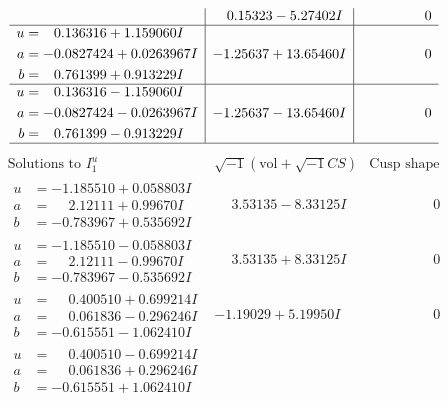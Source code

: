 \documentclass[1p]{elsarticle_modified}
\theoremstyle{definition}
\newcommand{\I}{\sqrt{-1}}
\begin{document}
$$\begin{array}{c|c|c}
 & \phantom{-}0.15323 - 5.27402 I & \phantom{-0.000000 } 0 \\ \hline\begin{aligned}
u &= \phantom{-}0.136316 + 1.159060 I \\
a &= -0.0827424 + 0.0263967 I \\
b &= \phantom{-}0.761399 + 0.913229 I\end{aligned}
 & -1.25637 + 13.65460 I & \phantom{-0.000000 } 0 \\ \hline\begin{aligned}
u &= \phantom{-}0.136316 - 1.159060 I \\
a &= -0.0827424 - 0.0263967 I \\
b &= \phantom{-}0.761399 - 0.913229 I\end{aligned}
 & -1.25637 - 13.65460 I & \phantom{-0.000000 } 0\\
 \hline 
 \end{array}$$\newpage$$\begin{array}{c|c|c}  
\text{Solutions to }I^u_{1}& \I (\text{vol} + \sqrt{-1}CS) & \text{Cusp shape}\\
 \hline 
\begin{aligned}
u &= -1.185510 + 0.058803 I \\
a &= \phantom{-}2.12111 + 0.99670 I \\
b &= -0.783967 + 0.535692 I\end{aligned}
 & \phantom{-}3.53135 - 8.33125 I & \phantom{-0.000000 } 0 \\ \hline\begin{aligned}
u &= -1.185510 - 0.058803 I \\
a &= \phantom{-}2.12111 - 0.99670 I \\
b &= -0.783967 - 0.535692 I\end{aligned}
 & \phantom{-}3.53135 + 8.33125 I & \phantom{-0.000000 } 0 \\ \hline\begin{aligned}
u &= \phantom{-}0.400510 + 0.699214 I \\
a &= \phantom{-}0.061836 - 0.296246 I \\
b &= -0.615551 - 1.062410 I\end{aligned}
 & -1.19029 + 5.19950 I & \phantom{-0.000000 } 0 \\ \hline\begin{aligned}
u &= \phantom{-}0.400510 - 0.699214 I \\
a &= \phantom{-}0.061836 + 0.296246 I \\
b &= -0.615551 + 1.062410 I\end{aligned}

\end{array}$$
\end{document}

